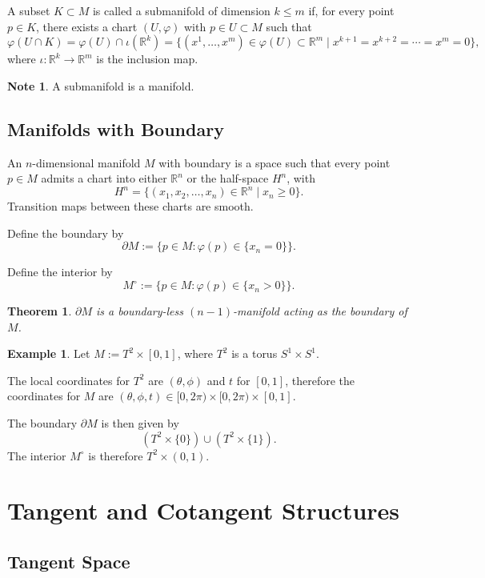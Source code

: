 \documentclass[11pt]{report}
\theoremstyle{definition}
\newtheorem{example}[definition]{Example}
\newtheorem{note}[definition]{Note}
\theoremstyle{plain}
\newtheorem{theorem}[definition]{Theorem}
\theoremstyle{remark}
\newcommand{\R}{\mathbb{R}}
\begin{document}
A subset $K\subset M$ is called a submanifold of dimension $k\le m$ if, for every point $p\in K$, there exists a chart $(U,\varphi)$ with $p\in U\subset M$ such that
\[
\varphi(U\cap K)=\varphi(U)\cap \iota(\R^k)
=\{(x^1,\dots,x^m)\in \varphi(U)\subset \R^m\mid x^{k+1}=x^{k+2}=\cdots=x^m=0\},
\]
where $\iota:\R^k\to \R^m$ is the inclusion map.

\begin{note}
A submanifold is a manifold.
\end{note}

\section{Manifolds with Boundary}

An $n$-dimensional manifold $M$ with boundary is a space such that every point $p\in M$ admits a chart into either $\R^n$ or the half-space $H^n$, with
\[
H^n=\{(x_1,x_2,\dots,x_n)\in \R^n\mid x_n\ge 0\}.
\]
Transition maps between these charts are smooth.

Define the boundary by
\[
\partial M:=\{p\in M:\varphi(p)\in\{x_n=0\}\}.
\]

Define the interior by
\[
M^\circ:=\{p\in M:\varphi(p)\in\{x_n>0\}\}.
\]

\begin{theorem}
$\partial M$ is a boundary-less $(n-1)$-manifold acting as the boundary of $M$.
\end{theorem}

\begin{example}
Let $M:=T^2\times [0,1]$, where $T^2$ is a torus $S^1\times S^1$.

The local coordinates for $T^2$ are $(\theta,\phi)$ and $t$ for $[0,1]$, therefore the coordinates for $M$ are $(\theta,\phi,t)\in[0,2\pi)\times[0,2\pi)\times[0,1]$.

The boundary $\partial M$ is then given by
\[
(T^2\times\{0\})\cup(T^2\times\{1\}).
\]
The interior $M^\circ$ is therefore $T^2\times(0,1)$.
\end{example}

\chapter{Tangent and Cotangent Structures}

\section{Tangent Space}
\end{document}
